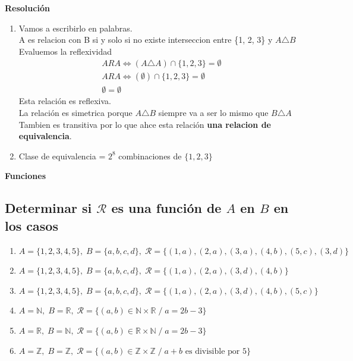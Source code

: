 \documentclass[11pt]{article}
\begin{document}
\textbf{Resolución}

\begin{enumerate}[label=\roman*)]
    \item Vamos a escribirlo en palabras. \\
    A es relacion con B si y solo si no existe interseccion entre \{1, 2, 3\} y $A \triangle B$ \\
    Evaluemos la reflexividad
    \begin{align*}
        A R A \Leftrightarrow (A \triangle A) \cap \{1,2,3\} = \emptyset \\
        A R A \Leftrightarrow (\emptyset) \cap \{1,2,3\} = \emptyset \\
        \emptyset = \emptyset 
    \end{align*}
    Esta relación es reflexiva. \\
    La relación es simetrica porque $A \triangle B$ siempre va a ser lo mismo que $ B \triangle A$ \\
    Tambien es transitiva por lo que ahce esta relación \textbf{una relacion de equivalencia}.
    \item Clase de equivalencia = $2^{8}$ combinaciones de $\{1,2,3\}$
\end{enumerate}

\textbf{Funciones}
\subsection{Determinar si $\mathcal{R}$ es una función de $A$ en $B$ en los casos}

\begin{enumerate}[label=\roman*)]
    \item $A = \{1,2,3,4,5\}, \; B = \{a,b,c,d\}, \; 
    \mathcal{R} = \{(1,a),(2,a),(3,a),(4,b),(5,c),(3,d)\}$

    \item $A = \{1,2,3,4,5\}, \; B = \{a,b,c,d\}, \; 
    \mathcal{R} = \{(1,a),(2,a),(3,d),(4,b)\}$

    \item $A = \{1,2,3,4,5\}, \; B = \{a,b,c,d\}, \; 
    \mathcal{R} = \{(1,a),(2,a),(3,d),(4,b),(5,c)\}$

    \item $A = \mathbb{N}, \; B = \mathbb{R}, \; 
    \mathcal{R} = \{(a,b) \in \mathbb{N} \times \mathbb{R} \; / \; a = 2b - 3\}$

    \item $A = \mathbb{R}, \; B = \mathbb{N}, \; 
    \mathcal{R} = \{(a,b) \in \mathbb{R} \times \mathbb{N} \; / \; a = 2b - 3\}$

    \item $A = \mathbb{Z}, \; B = \mathbb{Z}, \; 
    \mathcal{R} = \{(a,b) \in \mathbb{Z} \times \mathbb{Z} \; / \; a+b \text{ es divisible por } 5\}$
\end{enumerate}
\end{document}
